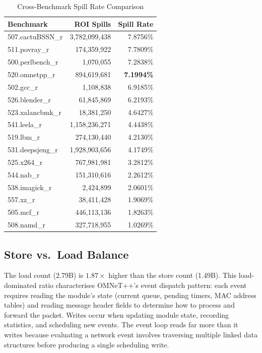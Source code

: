\documentclass[conference]{IEEEtran}
\begin{document}
\begin{table}[H]
\centering
\caption{Cross-Benchmark Spill Rate Comparison}
\label{tab:compare}
\begin{tabular}{lrr}
\toprule
\textbf{Benchmark} & \textbf{ROI Spills} & \textbf{Spill Rate} \\
\midrule
507.cactuBSSN\_r & 3,782,099,438 & 7.8756\% \\
511.povray\_r    &   174,359,922 & 7.7809\% \\
500.perlbench\_r &     1,070,055 & 7.2838\% \\
520.omnetpp\_r   &   894,619,681 & \textbf{7.1994\%} \\
502.gcc\_r       &     1,108,838 & 6.9185\% \\
526.blender\_r   &    61,845,869 & 6.2193\% \\
523.xalancbmk\_r &    18,381,250 & 4.6427\% \\
541.leela\_r     & 1,158,236,271 & 4.4438\% \\
519.lbm\_r       &   274,130,440 & 4.2130\% \\
531.deepsjeng\_r & 1,928,903,656 & 4.1749\% \\
525.x264\_r      &   767,981,981 & 3.2812\% \\
544.nab\_r       &   151,310,616 & 2.2612\% \\
538.imagick\_r   &     2,424,899 & 2.0601\% \\
557.xz\_r        &    38,411,428 & 1.9069\% \\
505.mcf\_r       &   446,113,136 & 1.8263\% \\
508.namd\_r      &   327,718,955 & 1.0269\% \\
\bottomrule
\end{tabular}
\end{table}

\subsection{Store vs.\ Load Balance}

The load count (2.79B) is $1.87\times$ higher than the store count
(1.49B). This load-dominated ratio characterises OMNeT++'s event
dispatch pattern: each event requires reading the module's state
(current queue, pending timers, MAC address tables) and reading
message header fields to determine how to process and forward the
packet. Writes occur when updating module state, recording statistics,
and scheduling new events. The event loop reads far more than it writes
because evaluating a network event involves traversing multiple
linked data structures before producing a single scheduling write.
\end{document}
